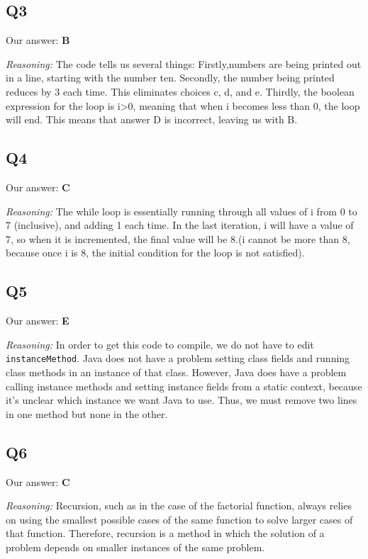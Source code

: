 \documentclass{article}
\begin{document}
\subsection{Q3}

Our answer: \textbf{B}

\noindent\textit{Reasoning:} The code tells us several things: 
Firstly,numbers are being printed out in a line, starting with the number ten. Secondly, the number being printed reduces by 3 each time. This eliminates choices c, d, and e. Thirdly, the boolean expression for the loop is i>0, meaning that when i becomes less than 0, the loop will end. This means that answer D is incorrect, leaving us with B. 

\subsection{Q4}

Our answer: \textbf{C}

\noindent\textit{Reasoning:} The while loop is essentially running through all values of i from 0 to 7 (inclusive), and adding 1 each time. In the last iteration, i will have a value of 7, so when it is incremented, the final value will be 8.(i cannot be more than 8, because once i is 8, the initial condition for the loop is not satisfied). 

\subsection{Q5}

Our answer: \textbf{E}

\noindent\textit{Reasoning:} In order to get this code to compile, we do not have to edit \verb|instanceMethod|. Java does not have a problem setting class fields and running class methods in an instance of that class. However, Java does have a problem calling instance methods and setting instance fields from a static context, because it's unclear which instance we want Java to use. Thus, we must remove two lines in one method but none in the other.


\subsection{Q6}

Our answer: \textbf{C}

\noindent\textit{Reasoning:} Recursion, such as in the case of the factorial function, always relies on using the smallest possible cases of the same function to solve larger cases of that function. Therefore, recursion is a method in which the solution of a problem depends on smaller instances of the same problem. 
\end{document}
